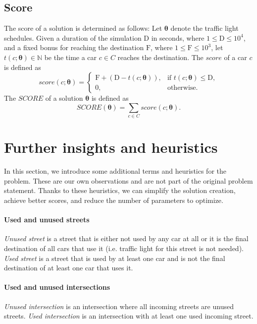 \newpage

\subsection{Score}

The score of a solution is determined as follows: Let $\bm{\theta}$ denote the traffic light schedules. Given a duration of the simulation $\mathrm{D}$ in seconds, where $1 \leq \mathrm{D} \leq 10^4$, and a fixed bonus for reaching the destination $\mathrm{F}$, where $1 \leq \mathrm{F} \leq 10^3$, let $t(c; \bm{\theta}) \in \mathbb{N}$ be the time a car $c \in C$ reaches the destination. The $score$ of a car $c$ is defined as
\begin{equation}
    score(c; \bm{\theta}) =
    \begin{cases}
        \mathrm{F} + (\mathrm{D} - t(c; \bm{\theta})), & \text{if $t(c; \bm{\theta}) \leq \mathrm{D}$}, \\
        0, & \text{otherwise}.
    \end{cases}
\end{equation}
The $SCORE$ of a solution $\bm{\theta}$ is defined as
\begin{equation}
    SCORE(\bm{\theta}) = \sum_{c \in C} score(c; \bm{\theta}).
\end{equation}

\section{Further insights and heuristics} \label{sec:further_insights_and_heuristics}

In this section, we introduce some additional terms and heuristics for the problem. These are our own observations and are not part of the original problem statement. Thanks to these heuristics, we can simplify the solution creation, achieve better scores, and reduce the number of parameters to optimize.

\paragraph{Used and unused streets} \textit{Unused street} is a street that is either not used by any car at all or it is the final destination of all cars that use it (i.e. traffic light for this street is not needed). \textit{Used street} is a street that is used by at least one car and is not the final destination of at least one car that uses it.

\paragraph{Used and unused intersections} \textit{Unused intersection} is an intersection where all incoming streets are unused streets. \textit{Used intersection} is an intersection with at least one used incoming street.


